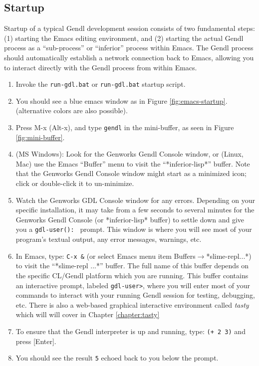 \documentclass [11pt]{book}
\begin{document}
\subsection{Startup}

\label{subsec:startup}

 Startup of a typical Gendl development session consists of
two fundamental steps: (1) starting the Emacs editing environment,
and (2) starting the actual Gendl process as a ``sub-process'' or ``inferior'' process 
within Emacs. The Gendl process should automatically establish a network connection
back to Emacs, allowing you to interact directly with the Gendl process from within Emacs.

\begin{enumerate}

\item Invoke the \texttt{run-gdl.bat} or \texttt{run-gdl.bat} startup script.

\item You should see a blue emacs window as in Figure 
\ref{fig:emacs-startup}. (alternative colors are also possible).

\item Press M-x (Alt-x), and type \texttt{gendl} in the mini-buffer, as seen in Figure 
\ref{fig:mini-buffer}.

\item (MS Windows): Look for the Genworks Gendl Console
window, or (Linux, Mac) use the Emacs ``Buffer'' menu to visit the
``*inferior-lisp*'' buffer. Note that the Genworks Gendl Console
window might start as a minimized icon; click or double-click it to
un-minimize.

\item Watch the Genworks GDL Console window for any
errors. Depending on your specific installation, it may take from a
few seconds to several minutes for the Genworks Gendl Console (or
*inferior-lisp* buffer) to settle down and give you a \texttt{gdl-user(): } prompt. This window is where you will see most of your program's textual output, any 
error messages, warnings, etc.

\item In Emacs, type: \texttt{C-x \&} (or select Emacs menu item Buffers$\rightarrow$*slime-repl...*) to visit the ``*slime-repl ...*'' buffer. The full name
of this buffer depends on the specific CL/Gendl platform which you are
running. This buffer contains an interactive prompt, labeled \texttt{gdl-user>}, where you will enter most of your commands to interact with your running Gendl session
for testing, debugging, etc. There is also a web-based graphical interactive environment called \emph{tasty} which will will cover in Chapter 
\ref{chapter:tasty}

\item To ensure that the Gendl interpreter is up and running, type: \texttt{(+ 2 3)} and press [Enter].

\item You should see the result \texttt{5} echoed back to you below the prompt.

\end{enumerate}
\end{document}
